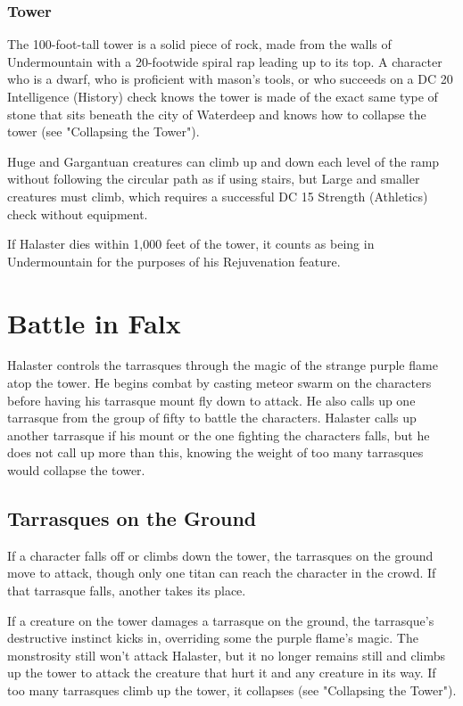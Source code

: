 \documentclass[10pt,a4paper,twoside,bg=print,twocolumn,openany,nodeprecatedcode]{dndbook}
\begin{document}
\subsubsection{Tower}
The 100-foot-tall tower is a solid piece of rock, made from the walls of Undermountain with a 20-footwide spiral rap leading up to its top. A character who is a dwarf, who is proficient with mason's tools, or who succeeds on a DC 20 Intelligence (History) check knows the tower is made of the exact same type of stone that sits beneath the city of Waterdeep and knows how to collapse the tower (see  "Collapsing the Tower").

Huge and Gargantuan creatures can climb up and down each level of the ramp without following the circular path as if using stairs, but Large and smaller creatures must climb, which requires a successful DC 15 Strength (Athletics) check without equipment.

If Halaster dies within 1,000 feet of the tower, it counts as being in Undermountain for the purposes of his Rejuvenation feature.

\section{Battle in Falx}
Halaster controls the tarrasques through the magic of the strange purple flame atop the tower. He begins combat by casting meteor swarm on the characters before having his tarrasque mount fly down to attack. He also calls up one tarrasque from the group of fifty to battle the characters. Halaster calls up another tarrasque if his mount or the one fighting the characters falls, but he does not call up more than this, knowing the weight of too many tarrasques would collapse the tower.

\subsection{Tarrasques on the Ground}
If a character falls off or climbs down the tower, the tarrasques on the ground move to attack, though only one titan can reach the character in the crowd. If that tarrasque falls, another takes its place.

If a creature on the tower damages a tarrasque on the ground, the tarrasque's destructive instinct kicks in, overriding some the purple flame's magic. The monstrosity still won't attack Halaster, but it no longer remains still and climbs up the tower to attack the creature that hurt it and any creature in its way. If too many tarrasques climb up the tower, it collapses (see "Collapsing the Tower").
\end{document}
